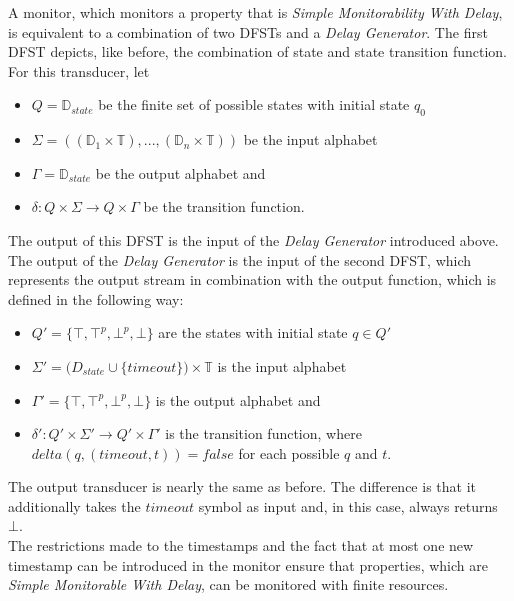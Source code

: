 	
		A monitor, which monitors a property that is \textit{Simple Monitorability With Delay}, is equivalent to a combination of two DFSTs and a \textit{Delay Generator}. The first DFST depicts, like before, the combination of state and state transition function. For this transducer, let
		\begin{itemize}
			\item
			$Q=\mathbb{D}_{state}$ be the finite set of possible states with initial state $q_0$
			\item
			$\Sigma=((\mathbb{D}_1\times \mathbb{T}),...,(\mathbb{D}_n\times \mathbb{T}))$ be the input alphabet
			\item
			$\Gamma = \mathbb D_{state}$ be the output alphabet and
			\item
			$\delta: Q\times \Sigma\rightarrow Q\times\Gamma$ be the transition function.
		\end{itemize}
		The output of this DFST is the input of the \textit{Delay Generator} introduced above. The output of the \textit{Delay Generator} is the input of the second DFST, which represents the output stream in combination with the output function, which is defined in the following way:
		\begin{itemize}
			\item
			$Q' = \{\top, \top^p, \bot^p, \bot\}$ are the states with initial state $q\in Q'$
			\item
			$\Sigma'=\mathbb (D_{state}\cup\{timeout\})\times \mathbb{T}$ is the input alphabet
			\item
			$\Gamma' = \{\top, \top^p, \bot^p, \bot\}$ is the output alphabet and
			\item
			$\delta': Q'\times \Sigma'\rightarrow Q'\times\Gamma'$ is the transition function, where $delta(q, (timeout, t))=false$ for each possible $q$ and $t$.
		\end{itemize}
		The output transducer is nearly the same as before. The difference is that it additionally takes the $timeout$ symbol as input and, in this case, always returns $\bot$.\\
		
	The restrictions made to the timestamps and the fact that at most one new timestamp can be introduced in the monitor ensure that properties, which are \textit{Simple Monitorable With Delay}, can be monitored with finite resources.

